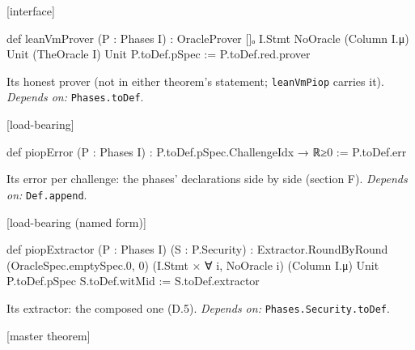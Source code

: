 \par\medskip\noindent\textbf{}\hfill\textsf{\small [interface]}\par\nopagebreak

\begin{leancode}
def leanVmProver (P : Phases I) :
    OracleProver []ₒ I.Stmt NoOracle (Column I.μ) Unit (TheOracle I) Unit P.toDef.pSpec :=
  P.toDef.red.prover
\end{leancode}


Its honest prover (not in either theorem's statement; \texttt{leanVmPiop} carries it). \emph{Depends on:} \texttt{Phases.\allowbreak{}toDef}.

\par\medskip\noindent\textbf{}\hfill\textsf{\small [load-bearing]}\par\nopagebreak

\begin{leancode}
def piopError (P : Phases I) : P.toDef.pSpec.ChallengeIdx → ℝ≥0 := P.toDef.err
\end{leancode}


Its error per challenge: the phases' declarations side by side (section F). \emph{Depends on:} \texttt{Def.\allowbreak{}append}.

\par\medskip\noindent\textbf{}\hfill\textsf{\small [load-bearing (named form)]}\par\nopagebreak

\begin{leancode}
def piopExtractor (P : Phases I) (S : P.Security) :
    Extractor.RoundByRound (OracleSpec.emptySpec.{0, 0}) (I.Stmt × ∀ i, NoOracle i)
      (Column I.μ) Unit P.toDef.pSpec S.toDef.witMid :=
  S.toDef.extractor
\end{leancode}


Its extractor: the composed one (D.5). \emph{Depends on:} \texttt{Phases.\allowbreak{}Security.\allowbreak{}toDef}.

\par\medskip\noindent\textbf{}\hfill\textsf{\small [master theorem]}\par\nopagebreak


